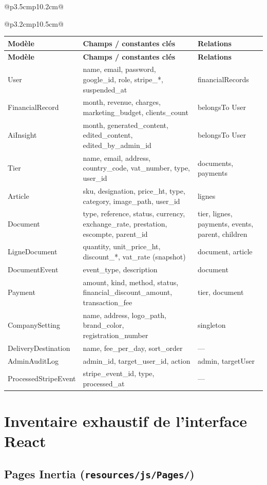 \documentclass[11pt,a4paper]{report}
\begin{document}
\begin{longtable}{@{}p{3.5cm}p{10.2cm}@{}}
\begin{longtable}{@{}p{3.2cm}p{10.5cm}@{}}
\begingroup
\footnotesize
\begin{longtable}{@{}p{2.8cm}p{5.5cm}p{5.2cm}@{}}
\toprule
\textbf{Modèle} & \textbf{Champs / constantes clés} & \textbf{Relations} \\
\midrule
\endfirsthead
\toprule
\textbf{Modèle} & \textbf{Champs / constantes clés} & \textbf{Relations} \\
\midrule
\endhead
User & name, email, password, google\_id, role, stripe\_*, suspended\_at & financialRecords \\
FinancialRecord & month, revenue, charges, marketing\_budget, clients\_count & belongsTo User \\
AiInsight & month, generated\_content, edited\_content, edited\_by\_admin\_id & belongsTo User \\
Tier & name, email, address, country\_code, vat\_number, type, user\_id & documents, payments \\
Article & sku, designation, price\_ht, type, category, image\_path, user\_id & lignes \\
Document & type, reference, status, currency, exchange\_rate, prestation, escompte, parent\_id & tier, lignes, payments, events, parent, children \\
LigneDocument & quantity, unit\_price\_ht, discount\_*, vat\_rate (snapshot) & document, article \\
DocumentEvent & event\_type, description & document \\
Payment & amount, kind, method, status, financial\_discount\_amount, transaction\_fee & tier, document \\
CompanySetting & name, address, logo\_path, brand\_color, registration\_number & singleton \\
DeliveryDestination & name, fee\_per\_day, sort\_order & — \\
AdminAuditLog & admin\_id, target\_user\_id, action & admin, targetUser \\
ProcessedStripeEvent & stripe\_event\_id, type, processed\_at & — \\
\bottomrule
\end{longtable}
\endgroup

\chapter{Inventaire exhaustif de l'interface React}
\label{annexe:frontend}

\section{Pages Inertia (\texttt{resources/js/Pages/})}


\end{longtable}
\end{longtable}
\end{document}
